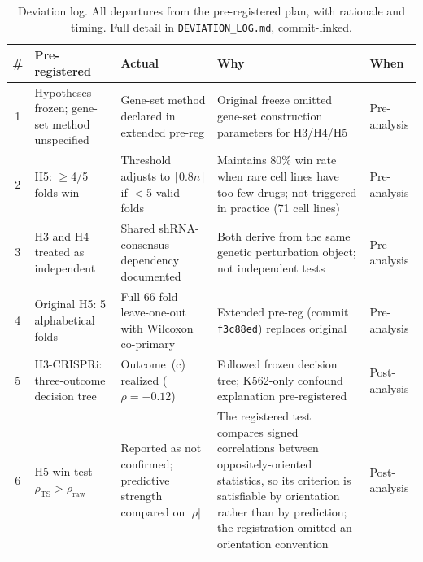 \documentclass[11pt]{article}
\begin{document}
\begin{table}[t]
\centering
\caption{Deviation log. All departures from the pre-registered plan, with
rationale and timing. Full detail in \texttt{DEVIATION\_LOG.md},
commit-linked.}
\label{tab:deviations}
\small
\begin{tabular}{cp{3.2cm}p{3.2cm}p{3.8cm}l}
\toprule
\# & Pre-registered & Actual & Why & When \\
\midrule
1 & Hypotheses frozen; gene-set method unspecified &
  Gene-set method declared in extended pre-reg &
  Original freeze omitted gene-set construction parameters for H3/H4/H5 &
  Pre-analysis \\
2 & H5: $\geq$4/5 folds win &
  Threshold adjusts to $\lceil 0.8 n \rceil$ if $<$5 valid folds &
  Maintains 80\% win rate when rare cell lines have too few drugs;
  not triggered in practice (71 cell lines) &
  Pre-analysis \\
3 & H3 and H4 treated as independent &
  Shared shRNA-consensus dependency documented &
  Both derive from the same genetic perturbation object; not independent tests &
  Pre-analysis \\
4 & Original H5: 5 alphabetical folds &
  Full 66-fold leave-one-out with Wilcoxon co-primary &
  Extended pre-reg (commit \texttt{f3c88ed}) replaces original &
  Pre-analysis \\
5 & H3-CRISPRi: three-outcome decision tree &
  Outcome~(c) realized ($\rho = -0.12$) &
  Followed frozen decision tree; K562-only confound explanation pre-registered &
  Post-analysis \\
6 & H5 win test $\rho_{\text{TS}} > \rho_{\text{raw}}$ &
  Reported as not confirmed; predictive strength compared on $|\rho|$ &
  The registered test compares signed correlations between
  oppositely-oriented statistics, so its criterion is satisfiable by
  orientation rather than by prediction; the registration omitted an
  orientation convention &
  Post-analysis \\
\bottomrule
\end{tabular}
\end{table}
\end{document}
